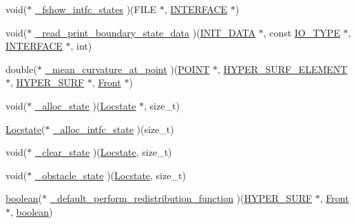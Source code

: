 \begin{DoxyCompactItemize}
\item 
void($\ast$ \hyperlink{struct___f___u_s_e_r___i_n_t_e_r_f_a_c_e_a22a497b8768e6a629c6c70ba3219829a}{\+\_\+fshow\+\_\+intfc\+\_\+states} )(F\+I\+LE $\ast$, \hyperlink{int_8h_a58cf562d0d320a608294b7310ea167dc}{I\+N\+T\+E\+R\+F\+A\+CE} $\ast$)
\item 
void($\ast$ \hyperlink{struct___f___u_s_e_r___i_n_t_e_r_f_a_c_e_a310ec245371e1e4627dd756a37877247}{\+\_\+read\+\_\+print\+\_\+boundary\+\_\+state\+\_\+data} )(\hyperlink{cdecs_8h_a18423d263765f9b6e78d8f1089446c91}{I\+N\+I\+T\+\_\+\+D\+A\+TA} $\ast$, const \hyperlink{cdecs_8h_ab53ca65803ae78b17636e622a6f2a062}{I\+O\+\_\+\+T\+Y\+PE} $\ast$, \hyperlink{int_8h_a58cf562d0d320a608294b7310ea167dc}{I\+N\+T\+E\+R\+F\+A\+CE} $\ast$, int)
\item 
double($\ast$ \hyperlink{struct___f___u_s_e_r___i_n_t_e_r_f_a_c_e_ad5856c97c1ab2ff385f0fd86a14280a1}{\+\_\+mean\+\_\+curvature\+\_\+at\+\_\+point} )(\hyperlink{int_8h_a3a87c5c9d0146e30a4bf720f701e5a63}{P\+O\+I\+NT} $\ast$, \hyperlink{int_8h_a17e21ae7174174d7a55516f8c9a8f12f}{H\+Y\+P\+E\+R\+\_\+\+S\+U\+R\+F\+\_\+\+E\+L\+E\+M\+E\+NT} $\ast$, \hyperlink{int_8h_acef50fa4757ce0d3f75c97fab5a175bc}{H\+Y\+P\+E\+R\+\_\+\+S\+U\+RF} $\ast$, \hyperlink{fdecs_8h_ac32202b798f848095c489cfd04c4ca5f}{Front} $\ast$)
\item 
void($\ast$ \hyperlink{struct___f___u_s_e_r___i_n_t_e_r_f_a_c_e_ad01f960778b39da1713a1e0092c5fc0c}{\+\_\+alloc\+\_\+state} )(\hyperlink{fdecs_8h_ace3c795e1cf7a6b6e5444944f0b59bcd}{Locstate} $\ast$, size\+\_\+t)
\item 
\hyperlink{fdecs_8h_ace3c795e1cf7a6b6e5444944f0b59bcd}{Locstate}($\ast$ \hyperlink{struct___f___u_s_e_r___i_n_t_e_r_f_a_c_e_af6876f5e5ed1ba55309c69b372318f01}{\+\_\+alloc\+\_\+intfc\+\_\+state} )(size\+\_\+t)
\item 
void($\ast$ \hyperlink{struct___f___u_s_e_r___i_n_t_e_r_f_a_c_e_a8c578799032cd5b6f4acee437d61899b}{\+\_\+clear\+\_\+state} )(\hyperlink{fdecs_8h_ace3c795e1cf7a6b6e5444944f0b59bcd}{Locstate}, size\+\_\+t)
\item 
void($\ast$ \hyperlink{struct___f___u_s_e_r___i_n_t_e_r_f_a_c_e_a4de79b181b17076cd7185d5515d1573f}{\+\_\+obstacle\+\_\+state} )(\hyperlink{fdecs_8h_ace3c795e1cf7a6b6e5444944f0b59bcd}{Locstate}, size\+\_\+t)
\item 
\hyperlink{cdecs_8h_ad048433382a936258fb49e2ec4f148e1}{boolean}($\ast$ \hyperlink{struct___f___u_s_e_r___i_n_t_e_r_f_a_c_e_a54a7835eadad5ff9919160f3efccfaea}{\+\_\+default\+\_\+perform\+\_\+redistribution\+\_\+function} )(\hyperlink{int_8h_acef50fa4757ce0d3f75c97fab5a175bc}{H\+Y\+P\+E\+R\+\_\+\+S\+U\+RF} $\ast$, \hyperlink{fdecs_8h_ac32202b798f848095c489cfd04c4ca5f}{Front} $\ast$, \hyperlink{cdecs_8h_ad048433382a936258fb49e2ec4f148e1}{boolean})

\end{DoxyCompactItemize}
